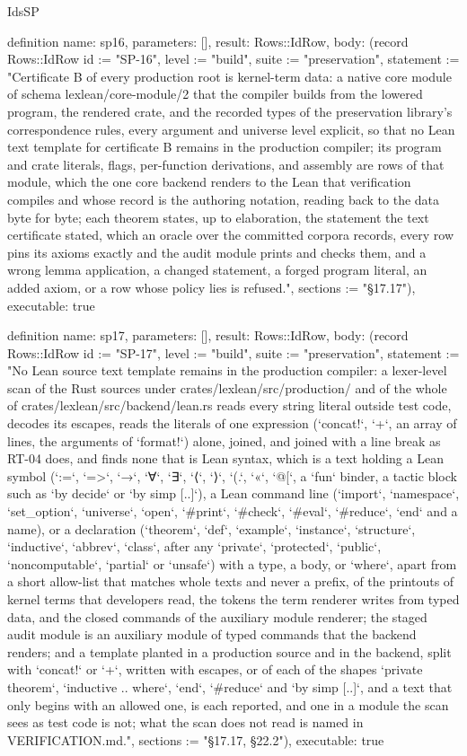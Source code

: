 \begin{lexlean}{IdsSP}
\begin{semanticmodule}
definition{
  name: sp16,
  parameters: [],
  result: Rows::IdRow,
  body: (record Rows::IdRow {id := "SP-16", level := "build", suite := "preservation", statement := "Certificate B of every production root is kernel-term data: a native core module of schema lexlean/core-module/2 that the compiler builds from the lowered program, the rendered crate, and the recorded types of the preservation library's correspondence rules, every argument and universe level explicit, so that no Lean text template for certificate B remains in the production compiler; its program and crate literals, flags, per-function derivations, and assembly are rows of that module, which the one core backend renders to the Lean that verification compiles and whose record is the authoring notation, reading back to the data byte for byte; each theorem states, up to elaboration, the statement the text certificate stated, which an oracle over the committed corpora records, every row pins its axioms exactly and the audit module prints and checks them, and a wrong lemma application, a changed statement, a forged program literal, an added axiom, or a row whose policy lies is refused.", sections := "§17.17"}),
  executable: true
}

definition{
  name: sp17,
  parameters: [],
  result: Rows::IdRow,
  body: (record Rows::IdRow {id := "SP-17", level := "build", suite := "preservation", statement := "No Lean source text template remains in the production compiler: a lexer-level scan of the Rust sources under crates/lexlean/src/production/ and of the whole of crates/lexlean/src/backend/lean.rs reads every string literal outside test code, decodes its escapes, reads the literals of one expression (`concat!`, `+`, an array of lines, the arguments of `format!`) alone, joined, and joined with a line break as RT-04 does, and finds none that is Lean syntax, which is a text holding a Lean symbol (`:=`, `=>`, `→`, `∀`, `∃`, `⟨`, `⟩`, `(.`, `«`, `@[`, a `fun` binder, a tactic block such as `by decide` or `by simp [..]`), a Lean command line (`import`, `namespace`, `set_option`, `universe`, `open`, `#print`, `#check`, `#eval`, `#reduce`, `end` and a name), or a declaration (`theorem`, `def`, `example`, `instance`, `structure`, `inductive`, `abbrev`, `class`, after any `private`, `protected`, `public`, `noncomputable`, `partial` or `unsafe`) with a type, a body, or `where`, apart from a short allow-list that matches whole texts and never a prefix, of the printouts of kernel terms that developers read, the tokens the term renderer writes from typed data, and the closed commands of the auxiliary module renderer; the staged audit module is an auxiliary module of typed commands that the backend renders; and a template planted in a production source and in the backend, split with `concat!` or `+`, written with escapes, or of each of the shapes `private theorem`, `inductive .. where`, `end`, `#reduce` and `by simp [..]`, and a text that only begins with an allowed one, is each reported, and one in a module the scan sees as test code is not; what the scan does not read is named in VERIFICATION.md.", sections := "§17.17, §22.2"}),
  executable: true
}


\end{semanticmodule}
\end{lexlean}

